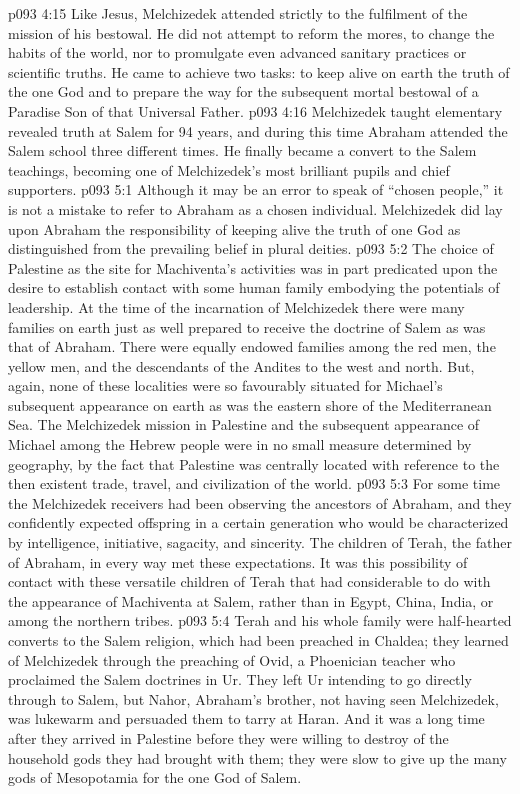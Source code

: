 \vs p093 4:15 Like Jesus, Melchizedek attended strictly to the fulfilment of the mission of his bestowal. He did not attempt to reform the mores, to change the habits of the world, nor to promulgate even advanced sanitary practices or scientific truths. He came to achieve two tasks: to keep alive on earth the truth of the one God and to prepare the way for the subsequent mortal bestowal of a Paradise Son of that Universal Father.
\vs p093 4:16 \pc Melchizedek taught elementary revealed truth at Salem for 94 years, and during this time Abraham attended the Salem school three different times. He finally became a convert to the Salem teachings, becoming one of Melchizedek’s most brilliant pupils and chief supporters.
\vs p093 5:1 Although it may be an error to speak of “chosen people,” it is not a mistake to refer to Abraham as a chosen individual. Melchizedek did lay upon Abraham the responsibility of keeping alive the truth of one God as distinguished from the prevailing belief in plural deities.
\vs p093 5:2 The choice of Palestine as the site for Machiventa’s activities was in part predicated upon the desire to establish contact with some human family embodying the potentials of leadership. At the time of the incarnation of Melchizedek there were many families on earth just as well prepared to receive the doctrine of Salem as was that of Abraham. There were equally endowed families among the red men, the yellow men, and the descendants of the Andites to the west and north. But, again, none of these localities were so favourably situated for Michael’s subsequent appearance on earth as was the eastern shore of the Mediterranean Sea. The Melchizedek mission in Palestine and the subsequent appearance of Michael among the Hebrew people were in no small measure determined by geography, by the fact that Palestine was centrally located with reference to the then existent trade, travel, and civilization of the world.
\vs p093 5:3 For some time the Melchizedek receivers had been observing the ancestors of Abraham, and they confidently expected offspring in a certain generation who would be characterized by intelligence, initiative, sagacity, and sincerity. The children of Terah, the father of Abraham, in every way met these expectations. It was this possibility of contact with these versatile children of Terah that had considerable to do with the appearance of Machiventa at Salem, rather than in Egypt, China, India, or among the northern tribes.
\vs p093 5:4 Terah and his whole family were half\hyp{}hearted converts to the Salem religion, which had been preached in Chaldea; they learned of Melchizedek through the preaching of Ovid, a Phoenician teacher who proclaimed the Salem doctrines in Ur. They left Ur intending to go directly through to Salem, but Nahor, Abraham’s brother, not having seen Melchizedek, was lukewarm and persuaded them to tarry at Haran. And it was a long time after they arrived in Palestine before they were willing to destroy  of the household gods they had brought with them; they were slow to give up the many gods of Mesopotamia for the one God of Salem.
